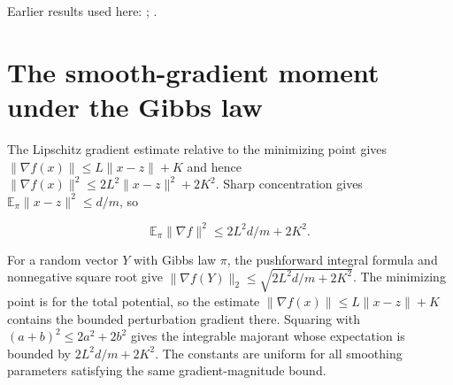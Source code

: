 \documentclass[11pt,a4paper]{article}
\begin{document}
Earlier results used here: \cite[Section~3.13.2]{LangevinLean2026ULASC}; \cite[Section~3.13.3]{LangevinLean2026ULASC}.

\section{\texorpdfstring{The smooth-gradient moment under the Gibbs law}{The smooth-gradient moment under the Gibbs law}}


The Lipschitz gradient estimate relative to the minimizing point gives \(\|\nabla f(x)\|\le L\|x-z\|+K\) and hence \(\|\nabla f(x)\|^2\le2L^2\|x-z\|^2+2K^2\). Sharp concentration gives \(\mathbb E_\pi\|x-z\|^2\le d/m\), so

\[\mathbb E_\pi\|\nabla f\|^2\le2L^2d/m+2K^2.\]

For a random vector \(Y\) with Gibbs law \(\pi\), the pushforward integral formula and nonnegative square root give \(\|\nabla f(Y)\|_2\le\sqrt{2L^2d/m+2K^2}\). The minimizing point is for the total potential, so the estimate \(\|\nabla f(x)\|\le L\|x-z\|+K\) contains the bounded perturbation gradient there. Squaring with \((a+b)^2\le2a^2+2b^2\) gives the integrable majorant whose expectation is bounded by \(2L^2d/m+2K^2\). The constants are uniform for all smoothing parameters satisfying the same gradient-magnitude bound.
\end{document}
